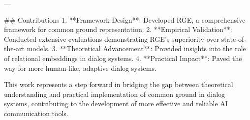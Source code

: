 ---

## Contributions
1. **Framework Design**: Developed RGE, a comprehensive framework for common ground representation.
2. **Empirical Validation**: Conducted extensive evaluations demonstrating RGE's superiority over state-of-the-art models.
3. **Theoretical Advancement**: Provided insights into the role of relational embeddings in dialog systems.
4. **Practical Impact**: Paved the way for more human-like, adaptive dialog systems.

This work represents a step forward in bridging the gap between theoretical understanding and practical implementation of common ground in dialog systems, contributing to the development of more effective and reliable AI communication tools.